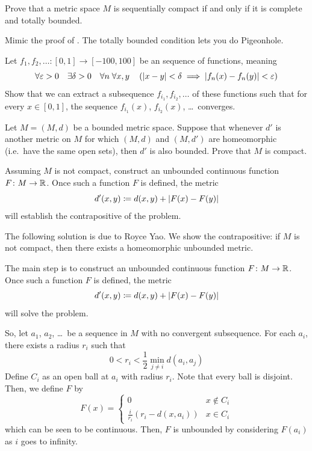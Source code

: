\begin{dproblem}
	\onechili
	Prove that a metric space $M$ is sequentially compact
	if and only if it is complete and totally bounded.
	\label{thm:bzw}
	\begin{hint}
		Mimic the proof of .
		The totally bounded condition lets you do Pigeonhole.
	\end{hint}
\end{dproblem}

\begin{problem}
	\onechili
	Let
	$f_1, f_2, \ldots \colon [0,1] \to [-100,100]$
	be an  sequence of functions, meaning
	\[
		\forall \varepsilon > 0 \quad
		\exists \delta > 0 \quad
		\forall n \;
		\forall x,y \quad
		\left( \left\lvert x-y \right\rvert <\delta
		\implies \left\lvert f_n(x) - f_n(y) \right\rvert < \varepsilon \right)
	\]
	Show that we can extract a subsequence $f_{i_1}, f_{i_2}, \dots$
	of these functions such that for every $x \in [0,1]$,
	the sequence $f_{i_1}(x)$, $f_{i_2}(x)$, \dots\ converges.
\end{problem}

\begin{problem}
	\onechili
	Let $M = (M,d)$ be a bounded metric space.
	Suppose that whenever $d'$ is another metric on $M$
	for which $(M,d)$ and $(M,d')$ are homeomorphic
	(i.e.\ have the same open sets), then $d'$ is also bounded.
	Prove that $M$ is compact.
	\begin{hint}
		Assuming $M$ is not compact, construct an
		unbounded continuous function $F \colon M \to \mathbb R$.
		Once such a function $F$ is defined, the metric
		\[ d'(x, y) \coloneqq d(x, y) + \left\lvert F(x) - F(y) \right\rvert \]
		will establish the contrapositive of the problem.
	\end{hint}

	\begin{sol}
		The following solution is due to Royce Yao.
		We show the contrapositive:
		if $M$ is not compact, then there exists a homeomorphic unbounded metric.

		The main step is to construct
		an unbounded continuous function $F \colon M \to \mathbb R$.
		Once such a function $F$ is defined, the metric
		\[ d'(x, y) \coloneqq d(x, y) + \left\lvert F(x) - F(y) \right\rvert \]
		will solve the problem.

		So, let $a_1$, $a_2$, \dots\ be a sequence in $M$
		with no convergent subsequence.
		For each $a_i$, there exists a radius $r_i$ such that
		\[ 0 < r_i < \frac{1}{2} \min_{j \neq i} d(a_i, a_j) \]
		Define $C_i$ as an open ball at $a_i$ with radius $r_i$.
		Note that every ball is disjoint.
		Then, we define $F$ by
		\[
			F(x) = \begin{cases}
				0 & x \not\in C_i \\
				\frac{i}{r_i}(r_i - d(x, a_i)) & x \in C_i
			\end{cases}
		\]
		which can be seen to be continuous.
		Then, $F$ is unbounded by considering $F(a_i)$ as $i$ goes to infinity.
	\end{sol}
\end{problem}

